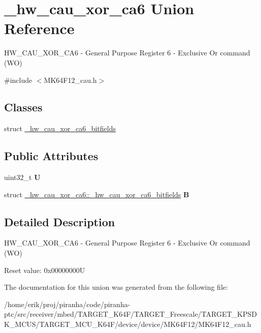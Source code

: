 \hypertarget{union__hw__cau__xor__ca6}{}\section{\+\_\+hw\+\_\+cau\+\_\+xor\+\_\+ca6 Union Reference}
\label{union__hw__cau__xor__ca6}


H\+W\+\_\+\+C\+A\+U\+\_\+\+X\+O\+R\+\_\+\+C\+A6 -\/ General Purpose Register 6 -\/ Exclusive Or command (WO)  




{\ttfamily \#include $<$M\+K64\+F12\+\_\+cau.\+h$>$}

\subsection*{Classes}
\begin{DoxyCompactItemize}
\item 
struct \hyperlink{struct__hw__cau__xor__ca6_1_1__hw__cau__xor__ca6__bitfields}{\+\_\+hw\+\_\+cau\+\_\+xor\+\_\+ca6\+\_\+bitfields}
\end{DoxyCompactItemize}
\subsection*{Public Attributes}
\begin{DoxyCompactItemize}
\item 
uint32\+\_\+t {\bfseries U}\hypertarget{union__hw__cau__xor__ca6_a8aa428684b8e2929b7e445e1f686b0b5}{}\label{union__hw__cau__xor__ca6_a8aa428684b8e2929b7e445e1f686b0b5}

\item 
struct \hyperlink{struct__hw__cau__xor__ca6_1_1__hw__cau__xor__ca6__bitfields}{\+\_\+hw\+\_\+cau\+\_\+xor\+\_\+ca6\+::\+\_\+hw\+\_\+cau\+\_\+xor\+\_\+ca6\+\_\+bitfields} {\bfseries B}\hypertarget{union__hw__cau__xor__ca6_ac2f008d0a2e61047f9ed75dbf0e95f3a}{}\label{union__hw__cau__xor__ca6_ac2f008d0a2e61047f9ed75dbf0e95f3a}

\end{DoxyCompactItemize}


\subsection{Detailed Description}
H\+W\+\_\+\+C\+A\+U\+\_\+\+X\+O\+R\+\_\+\+C\+A6 -\/ General Purpose Register 6 -\/ Exclusive Or command (WO) 

Reset value\+: 0x00000000U 

The documentation for this union was generated from the following file\+:\begin{DoxyCompactItemize}
\item 
/home/erik/proj/piranha/code/piranha-\/ptc/src/receiver/mbed/\+T\+A\+R\+G\+E\+T\+\_\+\+K64\+F/\+T\+A\+R\+G\+E\+T\+\_\+\+Freescale/\+T\+A\+R\+G\+E\+T\+\_\+\+K\+P\+S\+D\+K\+\_\+\+M\+C\+U\+S/\+T\+A\+R\+G\+E\+T\+\_\+\+M\+C\+U\+\_\+\+K64\+F/device/device/\+M\+K64\+F12/M\+K64\+F12\+\_\+cau.\+h\end{DoxyCompactItemize}
